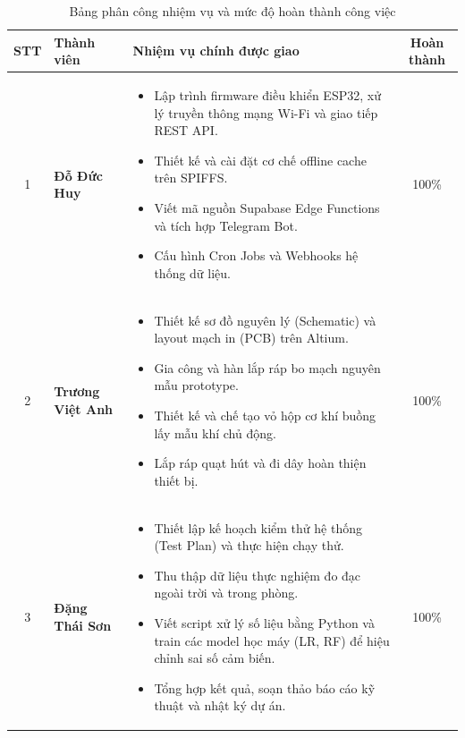 \begin{table}[H]
\centering
\caption{Bảng phân công nhiệm vụ và mức độ hoàn thành công việc}
\label{tab:taskallocation}
\begin{small}
\begin{tabular}{cp{3.5cm}p{7.0cm}c}
\toprule
\textbf{STT} & \textbf{Thành viên} & \textbf{Nhiệm vụ chính được giao} & \textbf{Hoàn thành} \\
\midrule
1 & \textbf{Đỗ Đức Huy} & 
\begin{itemize}
    \item Lập trình firmware điều khiển ESP32, xử lý truyền thông mạng Wi-Fi và giao tiếp REST API.
    \item Thiết kế và cài đặt cơ chế offline cache trên SPIFFS.
    \item Viết mã nguồn Supabase Edge Functions và tích hợp Telegram Bot.
    \item Cấu hình Cron Jobs và Webhooks hệ thống dữ liệu.
\end{itemize} & 100\% \\
\midrule
2 & \textbf{Trương Việt Anh} & 
\begin{itemize}
    \item Thiết kế sơ đồ nguyên lý (Schematic) và layout mạch in (PCB) trên Altium.
    \item Gia công và hàn lắp ráp bo mạch nguyên mẫu prototype.
    \item Thiết kế và chế tạo vỏ hộp cơ khí buồng lấy mẫu khí chủ động.
    \item Lắp ráp quạt hút và đi dây hoàn thiện thiết bị.
\end{itemize} & 100\% \\
\midrule
3 & \textbf{Đặng Thái Sơn} & 
\begin{itemize}
    \item Thiết lập kế hoạch kiểm thử hệ thống (Test Plan) và thực hiện chạy thử.
    \item Thu thập dữ liệu thực nghiệm đo đạc ngoài trời và trong phòng.
    \item Viết script xử lý số liệu bằng Python và train các model học máy (LR, RF) để hiệu chỉnh sai số cảm biến.
    \item Tổng hợp kết quả, soạn thảo báo cáo kỹ thuật và nhật ký dự án.
\end{itemize} & 100\% \\
\bottomrule
\end{tabular}
\end{small}
\end{table}
